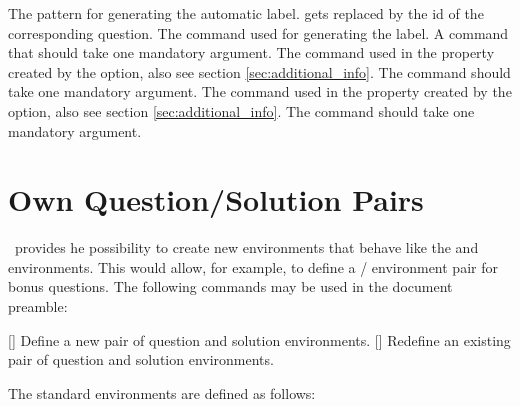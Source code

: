 \documentclass[load-preamble+,scrartcl={DIV10}]{cnltx-doc}
\begin{document}
\begin{options}
    The pattern for generating the automatic label.   gets replaced
    by the \ac{id} of the corresponding question.
    The command used for generating the label.  A command that should take one
    mandatory argument.
    The command used in the  property created by the
     option, also see section \ref{sec:additional_info}.
    The command should take one mandatory argument.
    The command used in the  property created by the
     option, also see section \ref{sec:additional_info}.
    The command should take one mandatory argument.
\end{options}


\section{Own Question/Solution Pairs}
\noindent{}\ExSheets\ provides he possibility to create new
environments that behave like the  and 
environments.  This would allow, for example, to define a
/ environment pair for bonus questions.  The
following commands may be used in the document preamble:
\begin{commands}
  []
    Define a new pair of question and solution environments.
  []
    Redefine an existing pair of question and solution environments.
\end{commands}
The standard environments are defined as follows:
\begin{sourcecode}
\end{sourcecode}
\end{document}
